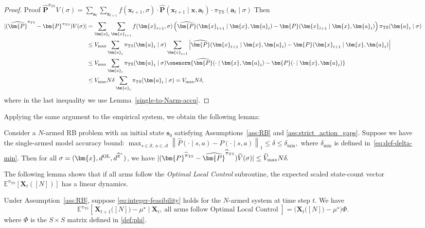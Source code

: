 \documentclass[mnsc,nonblindrev]{informs3}
\newcommand{\E}{\mathbb{E}}
\newcommand{\Vhat}{\widehat{V}}
\newcommand{\bp}{\bm{P}}
\newcommand{\bphat}{\widehat{\bm{P}}}
\newcommand{\pihbst}{\widehat{\Bar{\pi}}^\star}
\newcommand{\pits}{\pi_{\mathrm{TS}}}
\newcommand{\pihts}{\widehat{\pi}_{\mathrm{TS}}}
\newcommand{\bms}{\bm{s}}
\newcommand{\bma}{\bm{a}}
\newcommand{\bmx}{\bm{x}}
\begin{document}
\begin{APPENDICES}
\begin{proof}{Proof}
$
    \bphat^{\pits}V(\sigma) = \sum_{\bma_t}\sum_{\bm{x}_{t+1}}f(\bm{x}_{t+1},\sigma)\cdot \bphat(\bm{x}_{t+1}\mid \bmx, \bma_t)\cdot\pits(\bma_t\mid \sigma) 
$
Then
\begin{align*}
    |(\bphat^{\pits}-\bp^{\pits})V(\sigma)| & =\sum_{\bma_t}\sum_{\bm{x}_{t+1}}f(\bm{x}_{t+1},\sigma)\left(\bphat(\bm{x}_{t+1}\mid \bmx,\bma_t)-\bp(\bm{x}_{t+1}\mid \bmx,\bma_t)\right)\pits(\bma_t\mid \sigma)\\
     & \le V_{\max}\sum_{\bma_t}\pits(\bma_t\mid \sigma)\sum_{\bm{x}_{t+1}}\left|\bphat(\bm{x}_{t+1}\mid \bmx,\bma_t)-\bp(\bm{x}_{t+1}\mid \bmx,\bma_t)\right|\\
     & \le V_{\max}\sum_{\bma_t}\pits(\bma_t\mid \sigma)\onenorm{\bphat(\cdot\mid \bmx,\bma_t)-\bp(\cdot\mid \bmx,\bma_t)} \\
     & \le V_{\max}N\delta \sum_{\bma_t}\pits(\bma_t\mid \sigma) = V_{\max}N\delta,
\end{align*}
where in the last inequality we use Lemma~\ref{single-to-Narm-accu}.
\end{proof}

Applying the same argument to the empirical system, we obtain the following lemma:
\begin{lemma}\label{lem:p-phat-vhat}
    Consider a $N$-armed RB problem with an initial state $\bms_0$ satisfying Assumptions~\ref{ass:RB} and \ref{ass:strict_action_gaps}. Suppose we have the single-armed model accuracy bound:
    $
        \max_{s \in \mathcal{S},\ a \in \mathcal{A}} \left\| \widehat{P}(\cdot \mid s, a) - P(\cdot \mid s, a) \right\|_1 \le \delta\le\delta_{\min},
    $
    where $\delta_{\min}$ is defined in~\eqref{eq:def-delta-min}. Then for all $\sigma=(\bmx,d^{\mathrm{OL}},d^{\pihbst})$, we have
    $
        |(\bp^{\pihts}-\widehat \bp^{\pihts} )\Vhat(\sigma)| \le \Vhat_{\max}N\delta.
    $
\end{lemma}

The following lemma shows that if all arms follow the \emph{Optimal Local Control} subroutine, the expected scaled state-count vector $\E^{\pits}[\bm{X}_t([N])]$ has a linear dynamics.
\begin{lemma}\label{lem:lemma1-hong}
Under Assumption~\ref{ass:RB}, suppose \eqref{eq:integer-feasibility} holds for the $N$-armed system at time step $t$. 
We have
\begin{equation}\label{eq:8}
\E^{\pits}\left[\, \bm{X}_{t+1}\bigl([N]\bigr)-\mu^{\star} \mid
\bm{X}_t,\ \text{all arms follow Optimal Local Control\ } \right]
= \bigl( \bm{X}_t\bigl([N]\bigr)-\mu^{\star} \bigr)\Phi .
\end{equation}
where $\Phi$ is the $S\times S$ matrix defined in \eqref{def:phi}.
\end{lemma}



\end{APPENDICES}
\end{document}
